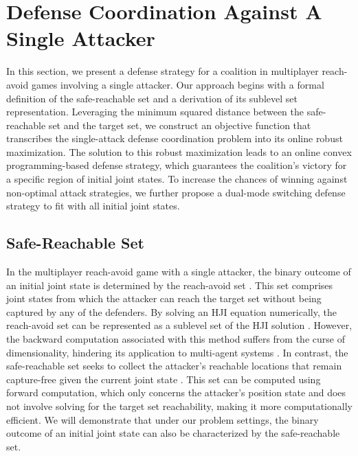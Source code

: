 \documentclass[journal]{IEEEtran}
\newcommand{\1}{\mathbf{1}}
\begin{document}
\section{Defense Coordination Against A Single Attacker}\label{sec:3}

In this section, we present a defense strategy for a coalition in multiplayer reach-avoid games involving a single attacker. Our approach begins with a formal definition of the safe-reachable set and a derivation of its sublevel set representation. Leveraging the minimum squared distance between the safe-reachable set and the target set, we construct an objective function that transcribes the single-attack defense coordination problem into its online robust maximization. The solution to this robust maximization leads to an online convex programming-based defense strategy, which guarantees the coalition's victory for a specific region of initial joint states. To increase the chances of winning against non-optimal attack strategies, we further propose a dual-mode switching defense strategy to fit with all initial joint states.

\subsection{Safe-Reachable Set}

In the multiplayer reach-avoid game with a single attacker, the binary outcome of an initial joint state is determined by the reach-avoid set \cite{margellos2011hamilton}. This set comprises joint states from which the attacker can reach the target set without being captured by any of the defenders. By solving an HJI equation numerically, the reach-avoid set can be represented as a sublevel set of the HJI solution \cite{mitchell2007toolbox}. However, the backward computation associated with this method suffers from the curse of dimensionality, hindering its application to multi-agent systems \cite{zhou2018efficient}. In contrast, the safe-reachable set seeks to collect the attacker's reachable locations that remain capture-free given the current joint state \cite{zhou2016cooperative}. This set can be computed using forward computation, which only concerns the attacker's position state and does not involve solving for the target set reachability, making it more computationally efficient. We will demonstrate that under our problem settings, the binary outcome of an initial joint state can also be characterized by the safe-reachable set.
\end{document}

